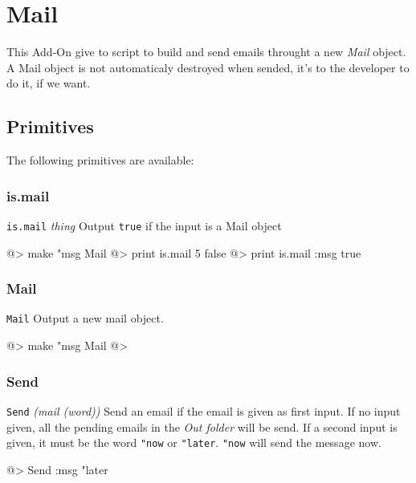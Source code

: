 \section{Mail}

This Add-On give to \squirrel script to build and send emails throught a new {\it Mail} object.\\

A Mail object is not automaticaly destroyed when sended, it's to the developer to do it, if we want.

\subsection{Primitives}

The following primitives are available:

\subsubsection*{is.mail}  

{\tt is.mail} {\it thing} 
\newline\newline 
Output {\tt true} if the input is a Mail object
\begin{verbatimtab} 
@> make "msg Mail
@> print is.mail 5
false
@> print is.mail :msg
true
\end{verbatimtab} 

\subsubsection*{Mail}  

{\tt Mail} 
\newline\newline 
Output a new mail object. 
\begin{verbatimtab} 
@> make "msg Mail
@>
\end{verbatimtab} 

\subsubsection*{Send}  

{\tt Send} {\it (mail (word))} 
\newline\newline 
Send an email if the email is given as first input. If no input given, all the pending emails in the {\it Out folder} will be send. If a second input is given, it must be the word {\tt "now} or {\tt "later}. {\tt "now} will send the message now. 
\begin{verbatimtab} 
@> Send :msg "later  
\end{verbatimtab} 

